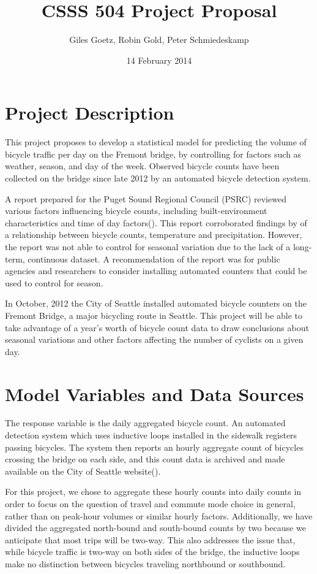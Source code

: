 \documentclass[10pt,letterpaper,article]{memoir} %
\title{CSSS 504 Project Proposal}
\author{Giles Goetz, Robin Gold, Peter Schmiedeskamp}
\date{14 February 2014} %
\begin{document}
\maketitle


\chapter*{Project Description}
This project proposes to develop a statistical model for predicting
the volume of bicycle traffic per day on the Fremont bridge, by
controlling for factors such as weather, season, and day of the week.
Observed bicycle counts have been collected on the bridge since late
2012 by an automated bicycle detection system.

A report prepared for the Puget Sound Regional Council (PSRC) reviewed
various factors influencing bicycle counts, including
built-environment characteristics and time of day
factors(\cite{Bassok:2011aa}). This report corroborated findings by
\textcite{City-of-Vancouver:1999aa,Niemeier:1996aa,Parkin:2008aa} of a
relationship between bicycle counts, temperature and precipitation.
However, the report was not able to control for seasonal variation due
to the lack of a long-term, continuous dataset. A recommendation of
the report was for public agencies and researchers to consider
installing automated counters that could be used to control for
season.

In October, 2012 the City of Seattle installed automated bicycle
counters on the Fremont Bridge, a major bicycling route in Seattle.
This project will be able to take advantage of a year's worth 
of bicycle count data to draw conclusions about seasonal variations and 
other factors affecting the number of cyclists on a given day.

\chapter*{Model Variables and Data Sources}
The response variable is the daily aggregated bicycle count. An
automated detection system which uses inductive loops installed in the
sidewalk registers passing bicycles. The system then reports an hourly
aggregate count of bicycles crossing the bridge on each side, and this
count data is archived and made available on the City of
Seattle website(\cite{City-of-Seattle:aa}).

For this project, we chose to aggregate these hourly counts into daily
counts in order to focus on the question of travel and commute mode
choice in general, rather than on peak-hour volumes or similar hourly
factors. Additionally, we have divided the aggregated north-bound and
south-bound counts by two because we anticipate that most trips will
be two-way. This also addresses the issue that, while bicycle traffic
is two-way on both sides of the bridge, the inductive loops make no
distinction between bicycles traveling northbound or southbound.
\end{document}
